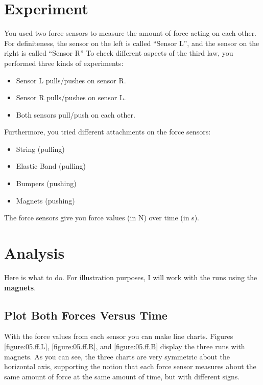 \section{Experiment}
You used two force sensors to measure the amount of force acting on each other. For definiteness, the sensor on the left is called ``Sensor L'', and the sensor on the right is called ``Sensor R'' To check different aspects of the third law, you performed three kinds of experiments:
\begin{itemize}
    \item Sensor L pulls/pushes on sensor R.
    \item Sensor R pulls/pushes on sensor L.
    \item Both sensors pull/push on each other.
\end{itemize}
Furthermore, you tried different attachments on the force sensors:
\begin{itemize}
    \item String (pulling)
    \item Elastic Band (pulling)
    \item Bumpers (pushing)
    \item Magnets (pushing)
\end{itemize}
The force sensors give you force values (in N) over time (in s).
\section{Analysis}
Here is what to do. For illustration purposes, I will work with the runs using the \textbf{magnets}.
\subsection{Plot Both Forces Versus Time}
With the force values from each sensor you can make line charts. Figures \ref{figure:05.ff.L}, \ref{figure:05.ff.R}, and \ref{figure:05.ff.B} display the three runs with magnets. As you can see, the three charts are very symmetric about the horizontal axis, supporting the notion that each force sensor measures about the same amount of force at the same amount of time, but with different signs.

